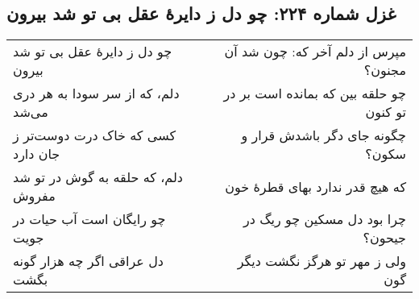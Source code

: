 \begin{center}
\section*{غزل شماره ۲۲۴: چو دل ز دایرهٔ عقل بی تو شد بیرون}
\label{sec:224}
\begin{longtable}{l p{0.5cm} r}
چو دل ز دایرهٔ عقل بی تو شد بیرون
&&
مپرس از دلم آخر که: چون شد آن مجنون؟
\\
دلم، که از سر سودا به هر دری می‌شد
&&
چو حلقه بین که بمانده است بر در تو کنون
\\
کسی که خاک درت دوست‌تر ز جان دارد
&&
چگونه جای دگر باشدش قرار و سکون؟
\\
دلم، که حلقه به گوش در تو شد مفروش
&&
که هیچ قدر ندارد بهای قطرهٔ خون
\\
چو رایگان است آب حیات در جویت
&&
چرا بود دل مسکین چو ریگ در جیحون؟
\\
دل عراقی اگر چه هزار گونه بگشت
&&
ولی ز مهر تو هرگز نگشت دیگر گون
\\
\end{longtable}
\end{center}
